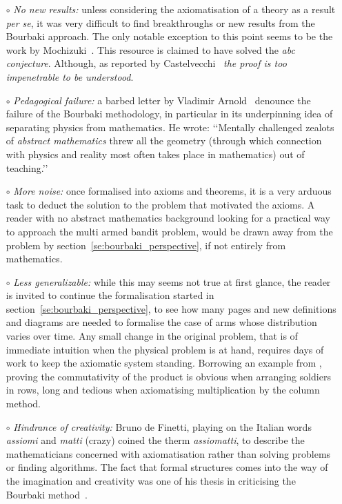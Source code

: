 \documentclass[]{scrartcl}
\theoremstyle{definition}
\begin{document}
\begin{itemize}

    \item[$\circ$] \emph{No new results:} unless considering the axiomatisation of a theory as a result \emph{per se}, it was very difficult to find breakthroughs or new results from the Bourbaki approach. The only notable exception to this point seems to be the work by Mochizuki~\cite{mochizuki2012inter}. This resource is claimed to have solved the \emph{abc conjecture}. Although, as reported by Castelvecchi~\cite{castelvecchi2015biggest} \emph{the proof is too impenetrable to be understood}.
     
    \item[$\circ$] \emph{Pedagogical failure:} a barbed letter by Vladimir Arnold~\cite{arnol1998teaching} denounce the failure of the Bourbaki methodology, in particular in its underpinning idea of separating physics from mathematics. He wrote: \lq\lq Mentally challenged zealots of \emph{abstract mathematics} threw all the geometry (through which connection with physics and reality most often takes place in mathematics) out of teaching.\rq\rq
    
    \item[$\circ$] \emph{More noise:} once formalised into axioms and theorems, it is a very arduous task to deduct the solution to the problem that motivated the axioms. A reader with no abstract mathematics background looking for a practical way to approach the multi armed bandit problem, would be drawn away from the problem by section~\ref{se:bourbaki_perspective}, if not entirely from mathematics. 
     
    \item[$\circ$] \emph{Less generalizable:} while this may seems not true at first glance, the reader is invited to continue the formalisation started in section~\ref{se:bourbaki_perspective}, to see how many pages and new definitions and diagrams are needed to formalise the case of arms whose distribution varies over time. Any small change in the original problem, that is of immediate intuition when the physical problem is at hand, requires days of work to keep the axiomatic system standing. Borrowing an example from \cite{arnol1998teaching}, proving the commutativity of the product is obvious when arranging soldiers in rows, long and tedious when axiomatising multiplication by the column method.
    
    \item[$\circ$] \emph{Hindrance of creativity:} Bruno de Finetti, playing on the Italian words \emph{assiomi} and \emph{matti} (crazy) coined the therm \emph{assiomatti}, to describe the mathematicians concerned with axiomatisation rather than solving problems or finding algorithms. The fact that formal structures comes into the way of the imagination and creativity was one of his thesis in criticising the Bourbaki method~\cite{de2008bruno}.


\end{itemize}
\end{document}
